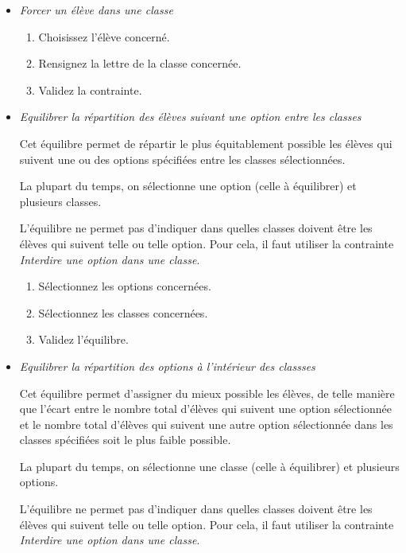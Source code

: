 \documentclass[11pt,a4paper]{article}
\begin{document}
\begin{enumerate}
\begin{itemize}
\begin{enumerate}
      \item Rensignez la lettre de la classe concernée.
      \item Validez la contrainte.
    \end{enumerate}
    \item \textit{Forcer un élève dans une classe}
    \begin{enumerate}
      \item Choisissez l'élève concerné.
      \item Rensignez la lettre de la classe concernée.
      \item Validez la contrainte.
    \end{enumerate}
    \item \textit{Equilibrer la répartition des élèves suivant une option entre les classes}
    \begin{note}Cet équilibre permet de répartir le plus équitablement possible les élèves qui suivent une ou des options spécifiées entre les classes sélectionnées.\end{note}\begin{astuce}La plupart du temps, on sélectionne une option (celle à équilibrer) et plusieurs classes.\end{astuce}\begin{attention}L'équilibre ne permet pas d'indiquer dans quelles classes doivent être les élèves qui suivent telle ou telle option. Pour cela, il faut utiliser la contrainte \textit{Interdire une option dans une classe}.\end{attention}
    \begin{enumerate}
      \item Sélectionnez les options concernées.
      \item Sélectionnez les classes concernées.
      \item Validez l'équilibre.
    \end{enumerate}
    \item \textit{Equilibrer la répartition des options à l'intérieur des classses}
    \begin{note}Cet équilibre permet d'assigner du mieux possible les élèves, de telle manière que l'écart entre le nombre total d'élèves qui suivent une option sélectionnée et le nombre total d'élèves qui suivent une autre option sélectionnée dans les classes spécifiées soit le plus faible possible.\end{note}\begin{astuce}La plupart du temps, on sélectionne une classe (celle à équilibrer) et plusieurs options.\end{astuce}\begin{attention}L'équilibre ne permet pas d'indiquer dans quelles classes doivent être les élèves qui suivent telle ou telle option. Pour cela, il faut utiliser la contrainte \textit{Interdire une option dans une classe}.\end{attention}

\end{itemize}
\end{enumerate}
\end{document}
